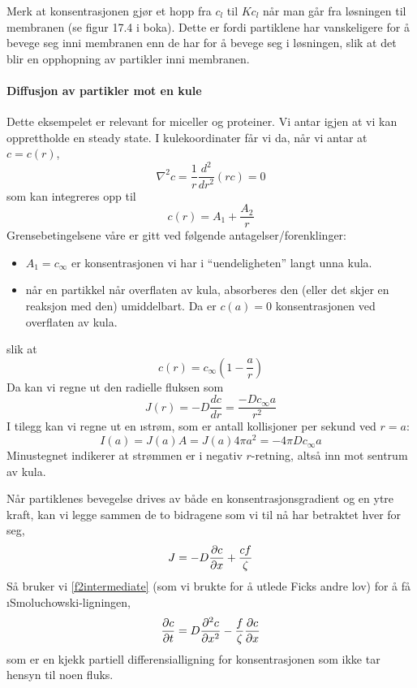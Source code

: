 Merk at konsentrasjonen gjør et hopp fra $c_l$ til $Kc_l$ når man går fra løsningen til membranen (se figur 17.4 i boka). Dette er fordi partiklene har vanskeligere for å bevege seg inni membranen enn de har for å bevege seg i løsningen, slik at det blir en opphopning av partikler inni membranen.

\paragraph{Diffusjon av partikler mot en kule} Dette eksempelet er relevant for miceller og proteiner. Vi antar igjen at vi kan opprettholde en steady state. I kulekoordinater får vi da, når vi antar at $c=c(r)$,
\begin{equation}
	\nabla^2c=\frac{1}{r}\frac{d^2}{dr^2}\left(rc\right)=0
\end{equation}
som kan integreres opp til
\begin{equation}
	c(r)=A_1+\frac{A_2}{r}
\end{equation}
Grensebetingelsene våre er gitt ved følgende antagelser/forenklinger:
\begin{itemize}
	\item $A_1=c_{\infty}$ er konsentrasjonen vi har i ``uendeligheten'' langt unna kula.
	\item når en partikkel når overflaten av kula, absorberes den (eller det skjer en reaksjon med den) umiddelbart. Da er $c(a)=0$ konsentrasjonen ved overflaten av kula.
\end{itemize}
slik at
\begin{equation}
	c(r)=c_{\infty}\left(1-\frac{a}{r}\right)
\end{equation}
Da kan vi regne ut den radielle fluksen som
\begin{equation}
	J(r)=-D\frac{dc}{dr}=\frac{-Dc_{\infty}a}{r^2}
\end{equation}
I tilegg kan vi regne ut en \i{strøm}, som er antall kollisjoner per sekund ved $r=a$:
\begin{equation}
	I(a)=J(a)A=J(a)4\pi a^2=-4\pi Dc_{\infty}a
\end{equation}
Minustegnet indikerer at strømmen er i negativ $r$-retning, altså inn mot sentrum av kula.

\noindent Når partiklenes bevegelse drives av både en konsentrasjonsgradient og en ytre kraft, kan vi legge sammen de to bidragene som vi til nå har betraktet hver for seg,
\begin{equation}
	J=-D\frac{\partial c}{\partial x}+\frac{cf}{\zeta}
\end{equation}
Så bruker vi \eqref{f2intermediate} (som vi brukte for å utlede Ficks andre lov) for å få \i{Smoluchowski-ligningen},
\begin{equation}
	\label{Smoluchowski}
	\frac{\partial c}{\partial t}=D\frac{\partial^2 c}{\partial x^2}-\frac{f}{\zeta}\frac{\partial c}{\partial x}
\end{equation}
som er en kjekk partiell differensialligning for konsentrasjonen som ikke tar hensyn til noen fluks.

